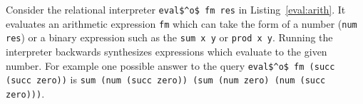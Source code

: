Consider the relational interpreter \lstinline{eval$^o$ fm res} in Listing~\ref{eval:arith}.
It evaluates an arithmetic expression \lstinline{fm} which can take the form of a number (\lstinline{num res}) or a binary expression such as the \lstinline{sum x y} or \lstinline{prod x y}.
Running the interpreter backwards synthesizes expressions which evaluate to the given number. For example one possible answer to the query \lstinline{eval$^o$ fm (succ (succ zero))} is \lstinline{sum (num (succ zero)) (sum (num zero) (num (succ zero)))}.


